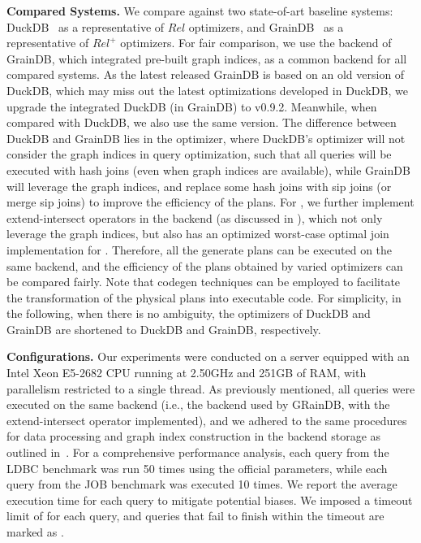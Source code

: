 \noindent\textbf{Compared Systems. }
We compare \name against two state-of-art baseline systems: DuckDB~\cite{duckdb} as a representative of $Rel$ optimizers, and GrainDB~\cite{graindb} as a representative of $Rel^+$ optimizers.
For fair comparison, we use the backend of GrainDB, which integrated pre-built graph indices, as a common backend for all compared systems.
As the latest released GrainDB is based on an old version of DuckDB, which may miss out the latest optimizations developed in DuckDB, we upgrade the integrated DuckDB (in GrainDB) to v0.9.2.
Meanwhile, when compared with DuckDB, we also use the same version.
The difference between DuckDB and GrainDB lies in the optimizer, where DuckDB's optimizer will not consider the graph indices in query optimization, such that all queries will be executed with hash joins (even when graph indices are available),
 while GrainDB will leverage the graph indices, and replace some hash joins with sip joins (or merge sip joins) to improve the efficiency of the plans.
For \name, we further implement extend-intersect operators in the backend (as discussed in ), which not only leverage the graph indices, but also has an optimized worst-case optimal join implementation for \intersect.
Therefore, all the generate plans can be executed on the same backend, and the efficiency of the plans obtained by varied optimizers can be compared fairly.
Note that codegen techniques can be employed to facilitate the transformation of the physical plans into executable code.
For simplicity, in the following, when there is no ambiguity, the optimizers of DuckDB and GrainDB are shortened to DuckDB and GrainDB, respectively.

\noindent\textbf{Configurations. }
Our experiments were conducted on a server equipped with an Intel Xeon E5-2682 CPU running at 2.50GHz and 251GB of RAM, with parallelism restricted to a single thread.
As previously mentioned, all queries were executed on the same backend (i.e., the backend used by GRainDB, with the extend-intersect operator implemented), and we adhered to the same procedures for data processing and graph index construction in the backend storage as outlined in~\cite{graindb}.
For a comprehensive performance analysis, each query from the LDBC benchmark was run 50 times using the official parameters, while each query from the JOB benchmark was executed 10 times. We report the average execution time for each query to mitigate potential biases.
We imposed a timeout limit of  for each query, and queries that fail to finish within the timeout are marked as \ot.

